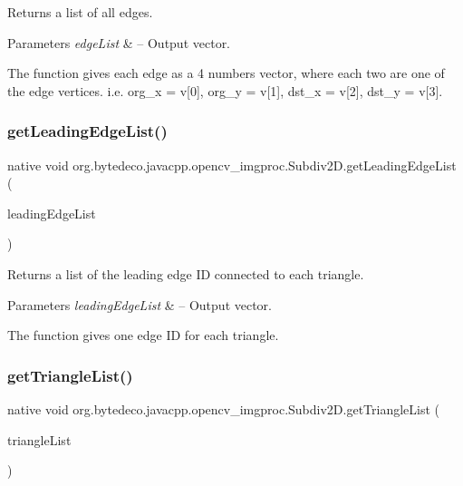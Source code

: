 Returns a list of all edges. 


\begin{DoxyParams}{Parameters}
{\em edge\+List} & – Output vector. \\
\hline
\end{DoxyParams}
The function gives each edge as a 4 numbers vector, where each two are one of the edge vertices. i.\+e. org\+\_\+x = v\mbox{[}0\mbox{]}, org\+\_\+y = v\mbox{[}1\mbox{]}, dst\+\_\+x = v\mbox{[}2\mbox{]}, dst\+\_\+y = v\mbox{[}3\mbox{]}. \mbox{\label{group__imgproc_gaf905b455bec0add07a982c747aa0462b}} 
\subsubsection{\texorpdfstring{get\+Leading\+Edge\+List()}{getLeadingEdgeList()}}
{\footnotesize\ttfamily native void org.\+bytedeco.\+javacpp.\+opencv\+\_\+imgproc.\+Subdiv2\+D.\+get\+Leading\+Edge\+List (\begin{DoxyParamCaption}\item[{@Std\+Vector Int\+Pointer}]{leading\+Edge\+List }\end{DoxyParamCaption})}



Returns a list of the leading edge ID connected to each triangle. 


\begin{DoxyParams}{Parameters}
{\em leading\+Edge\+List} & – Output vector. \\
\hline
\end{DoxyParams}
The function gives one edge ID for each triangle. \mbox{\label{group__imgproc_ga030c644089d5d56227b9546d06c12dcf}} 
\subsubsection{\texorpdfstring{get\+Triangle\+List()}{getTriangleList()}}
{\footnotesize\ttfamily native void org.\+bytedeco.\+javacpp.\+opencv\+\_\+imgproc.\+Subdiv2\+D.\+get\+Triangle\+List (\begin{DoxyParamCaption}\item[{@Cast(\char`\"{}cv\+::\+Vec6f$\ast$\char`\"{}) @Std\+Vector Float\+Pointer}]{triangle\+List }\end{DoxyParamCaption})}



